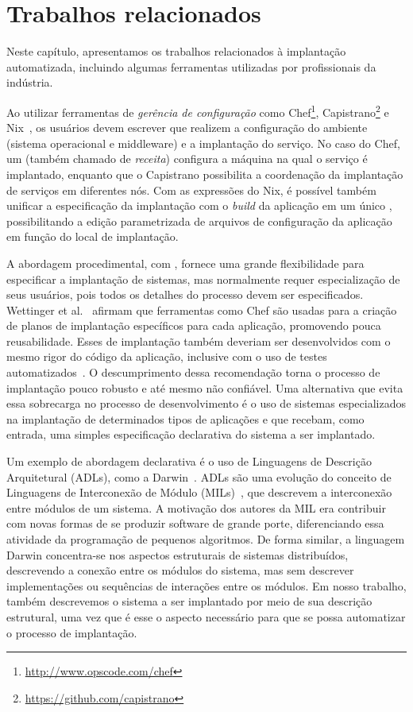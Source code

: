 
\chapter{Trabalhos relacionados}
\label{cap:relacionados}

Neste capítulo, apresentamos os trabalhos relacionados à implantação automatizada,
incluindo algumas ferramentas utilizadas por profissionais da indústria.

Ao utilizar ferramentas de \emph{gerência de configuração} como Chef\footnote{\url{http://www.opscode.com/chef}}, Capistrano\footnote{\url{https://github.com/capistrano}} e Nix~\cite{Dolstra2005Configuration}, os usuários devem escrever \scripts que realizem a configuração do ambiente (sistema operacional e middleware) e a implantação do serviço. No caso do Chef, um \script (também chamado de \emph{receita}) configura a máquina na qual o serviço é implantado, enquanto que o Capistrano possibilita a coordenação da implantação de serviços em diferentes nós. Com as expressões do Nix, é possível também unificar a especificação da implantação com o \textit{build} da aplicação em um único \script, possibilitando a edição parametrizada de arquivos de configuração da aplicação em função do local de implantação. 

A abordagem procedimental, com \scripts, fornece uma grande 
flexibilidade para especificar a implantação de sistemas, 
mas normalmente requer especialização de seus usuários, 
pois todos os detalhes do processo devem ser especificados. 
Wettinger et al.~\cite{Wettinger2013ExtensiblePaaS} 
afirmam que ferramentas como Chef são usadas
para a criação de planos de implantação específicos para cada aplicação,
promovendo pouca reusabilidade.
Esses \scripts de implantação também deveriam ser desenvolvidos 
com o mesmo rigor do código da aplicação, inclusive com o uso 
de testes automatizados~\cite{Humble2011Continuous}. 
O descumprimento dessa recomendação torna o processo de implantação 
pouco robusto e até mesmo não confiável. Uma alternativa que evita 
essa sobrecarga no processo de desenvolvimento é o uso de sistemas 
especializados na implantação de determinados tipos de aplicações e que recebam, 
como entrada, uma simples especificação declarativa do sistema a ser implantado.

Um exemplo de abordagem declarativa é o uso de Linguagens de Descrição Arquitetural (ADLs), como a Darwin~\cite{Magee1996Dynamic}. ADLs são uma evolução do conceito de Linguagens de Interconexão de Módulo (MILs)~\cite{DeRemer1976Programming}, que descrevem a interconexão entre módulos de um sistema. A motivação dos autores da MIL era contribuir com novas formas de se produzir software de grande porte, diferenciando essa atividade da programação de pequenos algoritmos. De forma similar, a linguagem Darwin concentra-se nos aspectos estruturais de sistemas distribuídos, descrevendo a conexão entre os módulos do sistema, mas sem descrever implementações ou sequências de interações entre os módulos. Em nosso trabalho, também descrevemos o sistema a ser implantado por meio de sua descrição estrutural, uma vez que é esse o aspecto necessário para que se possa automatizar o processo de implantação. 

